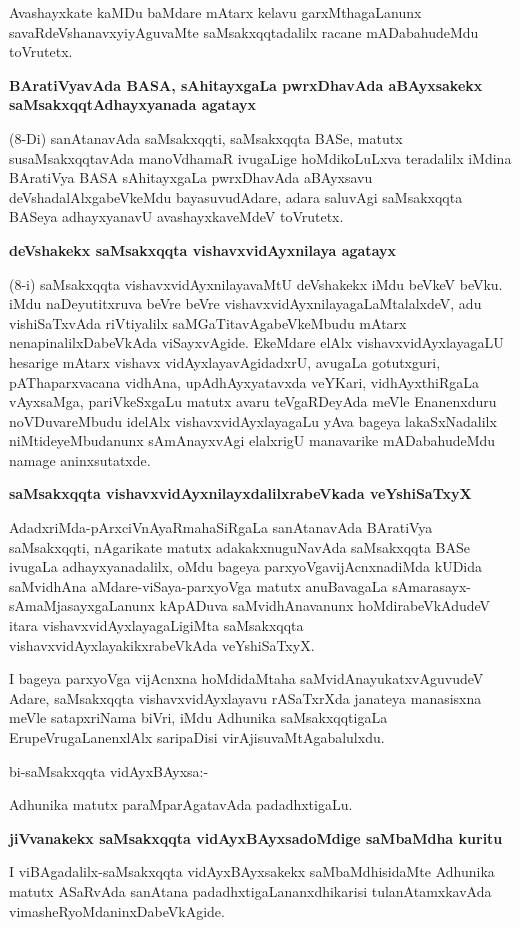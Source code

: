 Avashayxkate kaMDu baMdare mAtarx kelavu garxMthagaLanunx savaRdeVshanavxyiyAguvaMte saMsakxqqtadalilx racane mADabahudeMdu toVrutetx.

\textbf{BAratiVyavAda BASA, sAhitayxgaLa pwrxDhavAda aBAyxsakekx saMsakxqqtAdhayxyanada agatayx}

(8-Di) sanAtanavAda saMsakxqqti, saMsakxqqta BASe, matutx susaMsakxqqtavAda manoVdhamaR ivugaLige hoMdikoLuLxva teradalilx iMdina BAratiVya BASA sAhitayxgaLa pwrxDhavAda aBAyxsavu deVshadalAlxgabeVkeMdu bayasuvudAdare, adara saluvAgi saMsakxqqta BASeya adhayxyanavU avashayxkaveMdeV toVrutetx.

\textbf{deVshakekx saMsakxqqta vishavxvidAyxnilaya agatayx}

(8-i) saMsakxqqta vishavxvidAyxnilayavaMtU deVshakekx iMdu beVkeV beVku. iMdu naDeyutitxruva beVre beVre vishavxvidAyxnilayagaLaMtalalxdeV, adu vishiSaTxvAda riVtiyalilx saMGaTitavAgabeVkeMbudu mAtarx nenapinalilxDabeVkAda viSayxvAgide. EkeMdare elAlx vishavxvidAyxlayagaLU hesarige mAtarx vishavx vidAyxlayavAgidadxrU, avugaLa gotutxguri, pAThaparxvacana vidhAna, upAdhAyxyatavxda veYKari, vidhAyxthiRgaLa vAyxsaMga, pariVkeSxgaLu matutx avaru teVgaRDeyAda meVle Enanenxduru noVDuvareMbudu idelAlx vishavxvidAyxlayagaLu yAva bageya lakaSxNadalilx niMtideyeMbudanunx sAmAnayxvAgi elalxrigU manavarike mADabahudeMdu namage aninxsutatxde.

\textbf{saMsakxqqta vishavxvidAyxnilayxdalilxrabeVkada veYshiSaTxyX}

AdadxriMda-pArxciVnAyaRmahaSiRgaLa sanAtanavAda BAratiVya saMsakxqqti, nAgarikate matutx adakakxnuguNavAda saMsakxqqta BASe ivugaLa adhayxyanadalilx, oMdu bageya parxyoVgavijAcnxnadiMda kUDida saMvidhAna aMdare-viSaya-parxyoVga matutx anuBavagaLa sAmarasayx-sAmaMjasayxgaLanunx kApADuva saMvidhAnavanunx hoMdirabeVkAdudeV itara vishavxvidAyxlayagaLigiMta saMsakxqqta vishavxvidAyxlayakikxrabeVkAda veYshiSaTxyX.

I bageya parxyoVga vijAcnxna hoMdidaMtaha saMvidAnayukatxvAguvudeV Adare, saMsakxqqta vishavxvidAyxlayavu rASaTxrXda janateya manasisxna meVle satapxriNama biVri, iMdu Adhunika saMsakxqqtigaLa ErupeVrugaLanenxlAlx saripaDisi virAjisuvaMtAgabalulxdu.

bi-saMsakxqqta vidAyxBAyxsa:-

Adhunika matutx paraMparAgatavAda padadhxtigaLu.

\textbf{jiVvanakekx saMsakxqqta vidAyxBAyxsadoMdige saMbaMdha kuritu}

I viBAgadalilx-saMsakxqqta vidAyxBAyxsakekx saMbaMdhisidaMte Adhunika matutx ASaRvAda sanAtana padadhxtigaLananxdhikarisi tulanAtamxkavAda vimasheRyoMdaninxDabeVkAgide.

